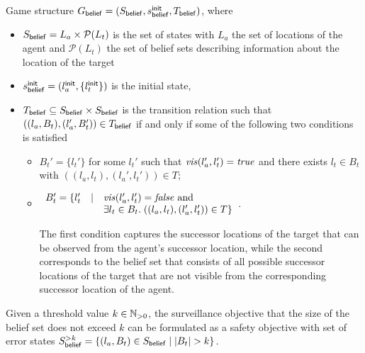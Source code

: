 Game structure $G_{\mathsf{belief}}  = (S_{\mathsf{belief}},s^{\mathsf{init}}_{\mathsf{belief}},T_{\mathsf{belief}})$, where
\begin{itemize}
\item $S_{\mathsf{belief}} = L_a \times \mathcal P(L_t)$ is the set of states with $L_a$ the set of locations of the agent and $\mathcal P(L_t)$ the set of belief sets describing information about the location of the target
\item $s^{\mathsf{init}}_{\mathsf{belief}} = (l_a^{\mathsf{init}},\{l_t^{\mathsf{init}}\})$ is the initial state,
\item $T_{\mathsf{belief}} \subseteq S_{\mathsf{belief}} \times S_{\mathsf{belief}}$ is the transition relation such that $((l_a, B_t),(l_a', B_t')) \in T_{\mathsf{belief}}$ if and only if some of the following two conditions is satisfied
\begin{itemize}
\item $B_t' = \{l_t'\}$ for some $l_t'$ such that $\mathit{vis}(l_a',l_t') = \mathit{true}$ and
there exists $l_t \in B_t$ with $((l_a,l_t),(l_a',l_t')) \in T$;
\item $\begin{array}{lll}
B_t' = \{l_t' & \mid & \mathit{vis}(l_a',l_t') = \mathit{false} \text{ and }\\
&&\exists l_t \in B_t.\; ((l_a,l_t),(l_a',l_t')) \in T\}
\end{array}
$. 

The first condition captures the successor locations of the target that can be observed from the agent's successor location, while the second  corresponds to the belief set that consists of all possible successor locations of the target that are not visible from the corresponding successor location of the agent.
\end{itemize}

\end{itemize}

Given a threshold value $k \in \mathbb{N}_{>0}$, the surveillance objective that the size of the belief set does not exceed $k$ can be formulated as a safety objective with set of error states $S_{\mathsf{belief}}^{>k} = \{(l_a, B_t) \in S_{\mathsf{belief}} \mid |B_t| > k\}$.
